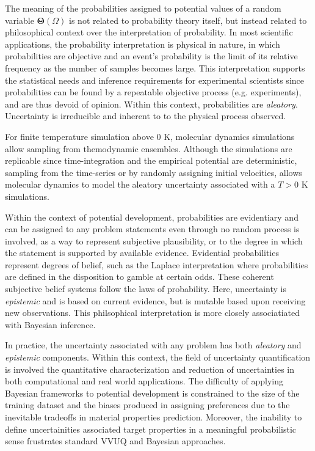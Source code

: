 The meaning of the probabilities assigned to potential values of a random variable $\bm{\Theta}(\Omega)$ is not related to probability theory itself, but instead related to philosophical context over the interpretation of probability.  In most scientific applications, the probability interpretation is physical in nature, in which probabilities are objective and an event's probability is the limit of its relative frequency as the number of samples becomes large.  This interpretation supports the statistical needs and inference requirements for experimental scientists since probabilities can be found by a repeatable objective process (e.g. experiments), and are thus devoid of opinion.  Within this context, probabilities are \emph{aleatory}.  Uncertainty is irreducible and inherent to to the physical process observed.

For finite temperature simulation above $0$ K, molecular dynamics simulations allow sampling from themodynamic ensembles.  Although the simulations are replicable since time-integration and the empirical potential are deterministic, sampling from the time-series or by randomly assigning initial velocities, allows molecular dynamics to model the aleatory uncertainty associated with a $T > 0$ K simulations.

Within the context of potential development, probabilities are evidentiary and can be assigned to any problem statements even through no random process is involved, as a way to represent subjective plausibility, or to the degree in which the statement is supported by available evidence.  Evidential probabilities represent degrees of belief, such as the Laplace interpretation where probabilities are defined in the disposition to gamble at certain odds\cite{laplace1902_probability}.  These coherent subjective belief systems follow the laws of probability\cite{ramsey2016truth,definetti1980_foresight}.  Here, uncertainty is \emph{epistemic} and is based on current evidence, but is mutable based upon receiving new observations\cite{ramsey2016truth,definetti1980_foresight,jaynes2003_probability}.  This philsophical interpretation is more closely associatiated with Bayesian inference\cite{gelman_bayesian}.

In practice, the uncertainty associated with any problem has both \emph{aleatory} and \emph{epistemic} components.  Within this context, the field of uncertainty quantification\cite{oberkampf2010_vvuq} is involved the quantitative characterization and reduction of uncertainties in both computational and real world applications.  The difficulty of applying Bayesian frameworks to potential development is constrained to the size of the training dataset and the biases produced in assigning preferences due to the inevitable tradeoffs in material properties prediction.  Moreover, the inability to define uncertainities associated target properties in a meaningful probabilistic sense frustrates standard VVUQ and Bayesian approaches.

